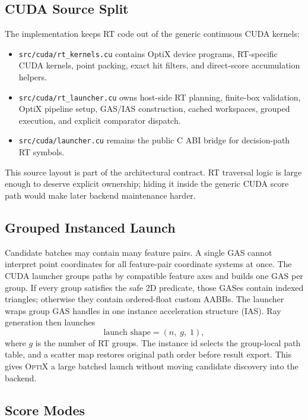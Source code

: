 \documentclass[11pt]{article}
\newcommand{\optix}{\textsc{OptiX}\xspace}
\begin{document}
\subsection{CUDA Source Split}

The implementation keeps RT code out of the generic continuous CUDA kernels:

\begin{itemize}
  \item \texttt{src/cuda/rt\_kernels.cu} contains OptiX device programs,
  RT-specific CUDA kernels, point packing, exact hit filters, and direct-score
  accumulation helpers.
  \item \texttt{src/cuda/rt\_launcher.cu} owns host-side RT planning, finite-box
  validation, OptiX pipeline setup, GAS/IAS construction, cached workspaces,
  grouped execution, and explicit comparator dispatch.
  \item \texttt{src/cuda/launcher.cu} remains the public C ABI bridge for
  decision-path RT symbols.
\end{itemize}

This source layout is part of the architectural contract. RT traversal logic is
large enough to deserve explicit ownership; hiding it inside the generic CUDA
score path would make later backend maintenance harder.

\subsection{Grouped Instanced Launch}

Candidate batches may contain many feature pairs. A single GAS cannot interpret
point coordinates for all feature-pair coordinate systems at once. The CUDA
launcher groups paths by compatible feature axes and builds one GAS per group.
If every group satisfies the safe 2D predicate, those GASes contain indexed
triangles; otherwise they contain ordered-float custom AABBs. The launcher wraps
group GAS handles in one instance acceleration structure (IAS). Ray generation
then launches
\[
  \text{launch shape} = (n,\;g,\;1),
\]
where $g$ is the number of RT groups. The instance id selects the group-local
path table, and a scatter map restores original path order before result export.
This gives \optix a large batched launch without moving candidate discovery into
the backend.

\subsection{Score Modes}
\end{document}

